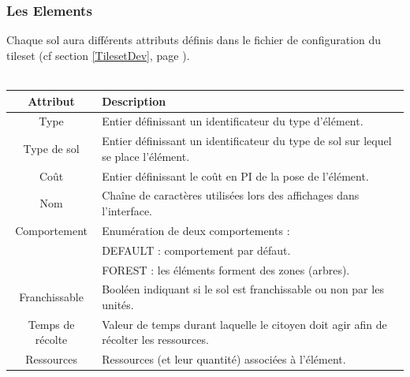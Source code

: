 \documentclass[a4paper]{article}
\newcommand{\alinea}{\hspace*{0.5cm}}
\begin{document}
        \subsubsection{Les Elements}
          \alinea Chaque sol aura différents attributs définis dans le fichier de configuration du tileset (cf section \ref{TilesetDev}, page \pageref{TilesetDev}).\\
          \\
	  	  \begin{small}
			\begin{tabular}{| c | l |}
			  \hline
			  \textbf{Attribut} & \textbf{Description}\\
			  \hline
			  Type & Entier définissant un identificateur du type d'élément.\\
			  \hline
			  Type de sol & Entier définissant un identificateur du type de sol sur lequel se place l'élément.\\
			  \hline
			  Coût & Entier définissant le coût en PI de la pose de l'élément.\\
			  \hline
			  Nom & Chaîne de caractères utilisées lors des affichages dans l'interface.\\
			  \hline
			  Comportement & Enumération de deux comportements :\\
			  & DEFAULT : comportement par défaut.\\
			  & FOREST : les éléments forment des zones (arbres).\\
			  \hline
			  Franchissable & Booléen indiquant si le sol est franchissable ou non par les unités.\\
			  \hline
			  Temps de récolte & Valeur de temps durant laquelle le citoyen doit agir afin de récolter les ressources.\\
			  \hline
			  Ressources & Ressources (et leur quantité) associées à l'élément.\\
			  \hline
			\end{tabular}
		  \end{small}
          
          
\end{document}
